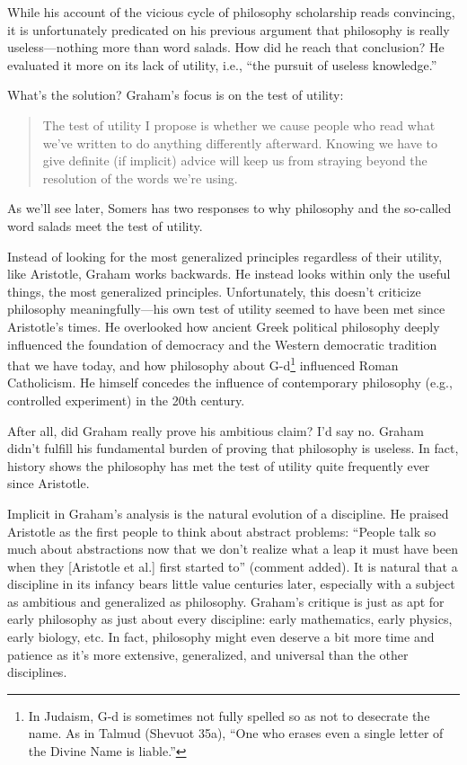 \documentclass[12pt]{article}
\begin{document}
While his account of the vicious cycle of philosophy scholarship reads convincing, it is unfortunately predicated on his previous argument that philosophy is really useless---nothing more than word salads. How did he reach that conclusion? He evaluated it more on its lack of utility, i.e., \enquote{the pursuit of useless knowledge.}

What's the solution? Graham's focus is on the test of utility:

\begin{quotation}
 The test of utility I propose is whether we cause people who read what we've written to do anything differently afterward. Knowing we have to give definite (if implicit) advice will keep us from straying beyond the resolution of the words we're using.
\end{quotation}

As we'll see later, Somers has two responses to why philosophy and the so-called word salads meet the test of utility.

Instead of looking for the most generalized principles regardless of their utility, like Aristotle, Graham works backwards. He instead looks within only the useful things, the most generalized principles. Unfortunately, this doesn't criticize philosophy meaningfully---his own test of utility seemed to have been met since Aristotle's times. He overlooked how ancient Greek political philosophy deeply influenced the foundation of democracy and the Western democratic tradition that we have today, and how philosophy about G-d\footnote{In Judaism, G-d is sometimes not fully spelled so as not to desecrate the name. As in Talmud (Shevuot 35a), \enquote{One who erases even a single letter of the Divine Name is liable.}} influenced Roman Catholicism. He himself concedes the influence of contemporary philosophy (e.g., controlled experiment) in the 20th century.

After all, did Graham really prove his ambitious claim? I'd say no. Graham didn't fulfill his fundamental burden of proving that philosophy is useless. In fact, history shows the philosophy has met the test of utility quite frequently ever since Aristotle.

Implicit in Graham's analysis is the natural evolution of a discipline. He praised Aristotle as the first people to think about abstract problems: \enquote{People talk so much about abstractions now that we don't realize what a leap it must have been when they [Aristotle et al.] first started to} (comment added). It is natural that a discipline in its infancy bears little value centuries later, especially with a subject as ambitious and generalized as philosophy. Graham's critique is just as apt for early philosophy as just about every discipline: early mathematics, early physics, early biology, etc. In fact, philosophy might even deserve a bit more time and patience as it's more extensive, generalized, and universal than the other disciplines.
\end{document}
